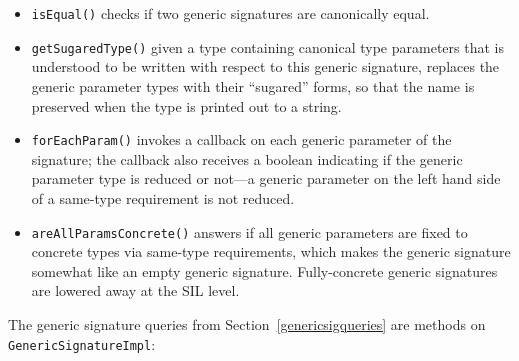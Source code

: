 \documentclass[../generics]{subfiles}
\begin{document}
\begin{itemize}
\item \texttt{isEqual()} checks if two generic signatures are canonically equal.
\item \texttt{getSugaredType()} given a type containing canonical type parameters that is understood to be written with respect to this generic signature, replaces the generic parameter types with their ``sugared'' forms, so that the name is preserved when the type is printed out to a string.
\item \texttt{forEachParam()} invokes a callback on each generic parameter of the signature; the callback also receives a boolean indicating if the generic parameter type is reduced or not---a generic parameter on the left hand side of a same-type requirement is not reduced.
\item \texttt{areAllParamsConcrete()} answers if all generic parameters are fixed to concrete types via same-type requirements, which makes the generic signature somewhat like an empty generic signature. Fully-concrete generic signatures are lowered away at the SIL level.
\end{itemize}
The generic signature queries from Section~\ref{genericsigqueries} are methods on \texttt{GenericSignatureImpl}:
\end{document}
